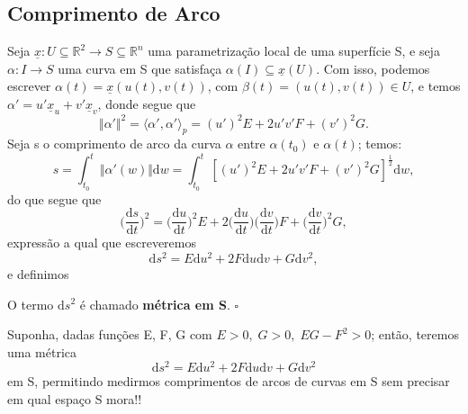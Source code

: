 \documentclass[../differential_geometry.tex]{subfiles}
\begin{document}
\subsection{Comprimento de Arco}
Seja \(\underline{x}:U\subseteq \mathbb{R}^{2}\rightarrow S\subseteq \mathbb{R}^{n}\) uma parametrização local de uma superfície S, e seja \(\alpha :I\rightarrow S\) uma curva em S que satisfaça \(\alpha (I)\subseteq \underline{x}(U)\).
Com isso, podemos escrever \(\alpha (t) = \underline{x}(u(t), v(t))\), com \(\beta (t) = (u(t), v(t))\in U\), e temos \(\alpha '=u'\underline{x}_{u} + v'\underline{x}_{v}\), donde segue que
\[
	\Vert \alpha ' \Vert^{2} = \langle \alpha', \alpha' \rangle_{p} = (u')^{2}E + 2u'v'F + (v')^{2}G.
\]
Seja s o comprimento de arco da curva \(\alpha \) entre \(\alpha (t_{0})\) e \(\alpha (t)\); temos:
\[
	s = \int_{t_{0}}^{t}\Vert \alpha '(w) \Vert \mathrm{d}w = \int_{t_{0}}^{t}[(u')^{2}E + 2u'v'F + (v')^{2}G]^{\frac{1}{2}} \mathrm{d}w,
\]
do que segue que
\[
	\biggl(\frac{\mathrm{d}s}{\mathrm{d}t}\biggr)^{2} = \biggl(\frac{\mathrm{d}u}{\mathrm{d}t}\biggr)^{2}E + 2\biggl(\frac{\mathrm{d}u}{\mathrm{d}t}\biggr)\biggl(\frac{\mathrm{d}v}{\mathrm{d}t}\biggr)F + \biggl(\frac{\mathrm{d}v}{\mathrm{d}t}\biggr)^{2}G,
\]
expressão a qual que escreveremos
\[
	\mathrm{d}s^{2} = E \mathrm{d}u^{2} + 2F \mathrm{d}u\mathrm{d}v + G \mathrm{d}v^{2},
\]
e definimos
\begin{def*}
	O termo \(\mathrm{d}s^{2}\) é chamado \textbf{métrica em S}. \(\square\)
\end{def*}

\begin{tcolorbox}[
		skin=enhanced,
		title=Observação,
		fonttitle=\bfseries,
		colframe=black,
		colbacktitle=cyan!75!white,
		colback=cyan!15,
		colbacklower=black,
		coltitle=black,
		drop fuzzy shadow,
	]
	Suponha, dadas funções E, F, G com \(E>0,\; G>0,\; EG - F^{2}>0\); então, teremos uma métrica
	\[
		\mathrm{d}s^{2} = E \mathrm{d}u^{2} + 2F\mathrm{d}u\mathrm{d}v + G \mathrm{d}v^{2}
	\]
	em S, permitindo medirmos comprimentos de arcos de curvas em S sem precisar em qual espaço S mora!!
\end{tcolorbox}
\end{document}
